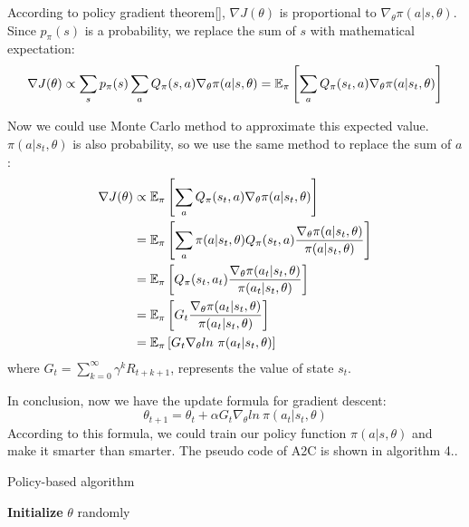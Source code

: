 According to policy gradient theorem[], $\nabla J(\theta)$ is proportional to $\nabla_\theta \pi(a|s,\theta)$. Since $p_\pi(s)$ is a probability, we replace the sum of $s$ with mathematical expectation:
$$
\nabla J(\theta) \propto \sum_s p_\pi(s) \sum_a Q_\pi(s,a) \nabla_\theta\pi(a|s,\theta) \\
=\mathbb{E}_\pi \left[ \sum_a Q_\pi(s_t,a) \nabla_\theta\pi(a|s_t,\theta) \right]
$$

Now we could use Monte Carlo method to approximate this expected value. $\pi(a|s_t,\theta)$ is also probability, so we use the same method to replace the sum of $a$:
\begin{equation}
    \notag
    \begin{aligned}
        \nabla J(\theta) & \propto \mathbb{E}_\pi \left[ \sum_a Q_\pi(s_t,a) \nabla_\theta\pi(a|s_t,\theta) \right] \\
        &=\mathbb{E}_\pi \left[ \sum_a \pi(a|s_t,\theta)Q_\pi(s_t,a) \frac{\nabla_\theta\pi(a|s_t,\theta)}{\pi(a|s_t,\theta)} \right] \\
        &=\mathbb{E}_\pi \left[ Q_\pi(s_t,a_t) \frac{\nabla_\theta\pi(a_t|s_t,\theta)}{\pi(a_t|s_t,\theta)} \right] \\
        &=\mathbb{E}_\pi \left[ G_t \frac{\nabla_\theta\pi(a_t|s_t,\theta)}{\pi(a_t|s_t,\theta)} \right] \\
        &=\mathbb{E}_\pi \left[ G_t \nabla_\theta ln\ \pi(a_t|s_t,\theta) \right]
    \end{aligned}
\end{equation}
where $G_t=\sum_{k=0}^\infty \gamma^k R_{t+k+1}$, represents the value of state $s_t$.

In conclusion, now we have the update formula for gradient descent:
$$
\theta_{t+1}=\theta_t+\alpha G_t \nabla_\theta ln\ \pi(a_t|s_t,\theta)
$$
According to this formula, we could train our policy function $\pi (a|s,\theta)$ and make it smarter than smarter. The pseudo code of A2C is shown in algorithm 4..

\begin{algorithm}
    \caption{Policy-based algorithm}
    \LinesNumbered
    \textbf{Initialize}{
        $\theta$ randomly
    } \\
\end{algorithm}

